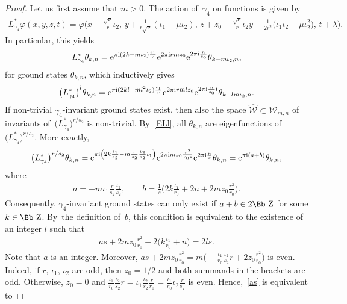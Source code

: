 \documentclass[pdftex]{sigma}
\newcommand\ZZ{{\mbox{\Bb Z}}}
\newcommand\cW{{\mathcal W}}
\newcommand\ph{\varphi}
\numberwithin{equation}{section}
\begin{document}
\begin{proof}
Let us first assume that $m>0$.
The action of~$\gamma_4$ on functions is given by
\begin{gather*}
L^*_{\gamma_4} \ph(x,y,z,t)=
\ph\bigg(x\!-\! \frac{\sqrt\nu}r\iota_2,\,y\!+\!\frac1{r\sqrt\nu}(\iota_1-\mu\iota_2),\,z\!+\!z_0- \frac{\sqrt\nu}r\iota_2y\!-\!\frac1{2r^2}\big(\iota_1\iota_2\!-\!\mu\iota_2^2\big),\,t\!+\!\lambda\bigg).
\end{gather*}
In particular, this yields
\begin{gather*}
L_{\gamma_4}^*\theta_{k,n}={\rm e}^{\pi {\rm i}(2k-m\iota_2)\frac{\iota_1}{r}}{\rm e}^{2\pi {\rm i} r m z_0}{\rm e}^{2\pi {\rm i} \frac{n}{s_0}} \theta_{k-m\iota_2,n},
\end{gather*}
for ground states $\theta_{k,n}$, which inductively gives
\begin{gather}\label{ELl}
\big(L_{\gamma_4}^*\big)^{l}\theta_{k,n}={\rm e}^{\pi {\rm i}(2kl-ml^2\iota_2)\frac{\iota_1}{r}}{\rm e}^{2\pi {\rm i} rml z_0}{\rm e}^{2\pi {\rm i} \frac{n}{s_0}l} \theta_{k-lm\iota_2,n}.
\end{gather}
If non-trivial $\gamma_4$-invariant ground states exist, then also the space $\hat\cW\subset {\mathcal W}_{m,n}$ of invariants of~$\big(L_{\gamma_4}^*\big)^{r/s_2}$ is non-trivial. By~\eqref{ELl}, all $\theta_{k,n}$ are eigenfunctions of~$\big(L_{\gamma_4}^*\big)^{r/s_2}$. More exactly,
\begin{gather*}
\big(L_{\gamma_4}^*\big)^{r/s_2}\theta_{k,n}={\rm e}^{\pi {\rm i}\left(2k\frac {\iota_1}{s_2}-m\frac r{s_2}\frac{\iota_2}{s_2}\iota_1\right)}{\rm e}^{2\pi {\rm i} mz_0\frac{r^2}{r_0s}}{\rm e}^{2\pi {\rm i} \frac{n}s} \theta_{k,n}={\rm e}^{\pi {\rm i}(a+b)} \theta_{k,n},
\end{gather*}
where
\begin{gather*}
a= -m \iota_1 \frac r{s_2} \frac{\iota_2}{s_2},\qquad
b= \frac1s \bigg(2k \frac{\iota_1}{r_0} +2n+2mz_0\frac{r^2}{r_0}\bigg).
\end{gather*}
Consequently, $\gamma_4$-invariant ground states can only exist if $a+b\in 2\ZZ$ for some $k\in\ZZ$. By~the definition of~$b$, this condition is equivalent to the existence of an integer $l$ such that
\begin{gather}\label{as}
 as +2mz_0\frac{r^2}{r_0}+2\bigg(k\frac {\iota_1}{r_0} +n\bigg)=2ls.
\end{gather}
Note that $a$ is an integer. Moreover, $as+2mz_0\frac{r^2}{r_0}=m\big({-}\frac{\iota_1}{r_0} \frac{\iota_2}{s_2} r+2z_0\frac{r^2}{r_0}\big)$ is even. Indeed, if $r$, $\iota_1$, $\iota_2$ are odd, then $z_0=1/2$ and both summands in the brackets are odd. Otherwise, $z_0=0$ and $\frac{\iota_1}{r_0} \frac{\iota_2}{s_2} r ={\iota_1} \frac{\iota_2}{s_2} \frac r{r_0}=\frac{\iota_1}{r_0} \iota_2 \frac r{s_2}$ is even. Hence,~\eqref{as} is equivalent to

\end{proof}
\end{document}
